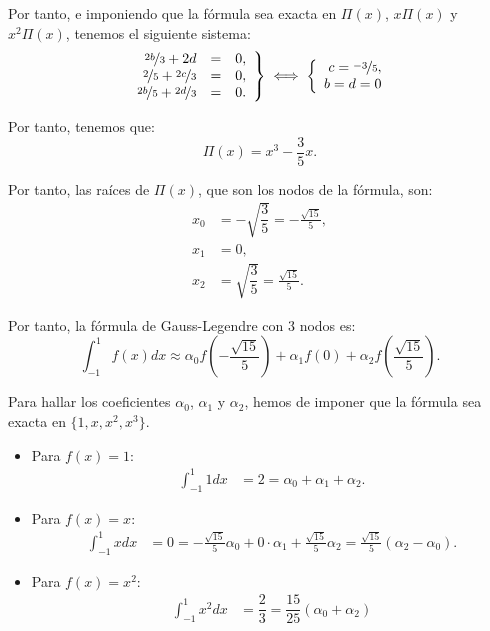 \begin{ejercicio}
    Por tanto, e imponiendo que la fórmula sea exacta en $\Pi(x)$, $x\Pi(x)$ y $x^2\Pi(x)$, tenemos el siguiente sistema:
    \begin{align*}
        \left.
        \begin{array}{rcl}
            \nicefrac{2b}{3} + 2d &=& 0,\\
            \nicefrac{2}{5} + \nicefrac{2c}{3} &=& 0,\\
            \nicefrac{2b}{5} + \nicefrac{2d}{3} &=& 0.
        \end{array}
        \right\}
        \iff
        \left\{
        \begin{array}{rcl}
            c=\nicefrac{-3}{5},\\
            b=d=0
        \end{array}
        \right.
    \end{align*}

    Por tanto, tenemos que:
    \begin{equation*}
        \Pi(x) = x^3 - \dfrac{3}{5}x.
    \end{equation*}

    Por tanto, las raíces de $\Pi(x)$, que son los nodos de la fórmula, son:
    \begin{align*}
        x_0 &= -\sqrt{\dfrac{3}{5}} = -\frac{\sqrt{15}}{5},\\
        x_1 &= 0,\\
        x_2 &= \sqrt{\dfrac{3}{5}} = \frac{\sqrt{15}}{5}.
    \end{align*}

    Por tanto, la fórmula de Gauss-Legendre con 3 nodos es:
    \begin{equation*}
        \int_{-1}^{1} f(x) dx \approx \alpha_0 f\left(-\frac{\sqrt{15}}{5}\right) + \alpha_1 f(0) + \alpha_2 f\left(\frac{\sqrt{15}}{5}\right).
    \end{equation*}

    Para hallar los coeficientes $\alpha_0$, $\alpha_1$ y $\alpha_2$, hemos de imponer que la fórmula sea exacta en $\{1,x,x^2,x^3\}$.
    \begin{itemize}
        \item Para $f(x) = 1$:
        \begin{align*}
            \int_{-1}^{1} 1 dx &= 2 = \alpha_0 + \alpha_1 + \alpha_2.
        \end{align*}
        \item Para $f(x) = x$:
        \begin{align*}
            \int_{-1}^{1} x dx &= 0 = -\frac{\sqrt{15}}{5}\alpha_0 + 0\cdot\alpha_1 + \frac{\sqrt{15}}{5}\alpha_2
            = \frac{\sqrt{15}}{5}(\alpha_2 - \alpha_0).
        \end{align*}
        \item Para $f(x) = x^2$:
        \begin{align*}
            \int_{-1}^{1} x^2 dx &= \dfrac{2}{3} = \dfrac{15}{25}(\alpha_0 + \alpha_2)
        \end{align*}
    \end{itemize}


\end{ejercicio}

